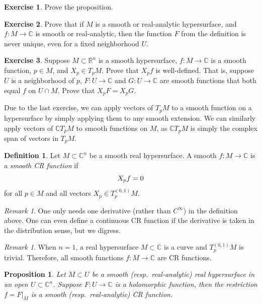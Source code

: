 \documentclass[12pt,openany]{book}
\newcommand{\avoidbreak}{\postdisplaypenalty=100}
\newcommand{\C}{{\mathbb{C}}}
\newcommand{\R}{{\mathbb{R}}}
\newcommand{\myindex}[1]{#1\index{#1}}
\theoremstyle{plain}
\newtheorem{prop}[thm]{Proposition}
\theoremstyle{remark}
\newtheorem{remark}[thm]{Remark}
\theoremstyle{definition}
\newtheorem{defn}[thm]{Definition}
\newenvironment{exbox}{%
    \def\FrameCommand{\vrule width 1pt \relax\hspace{10pt}}%
    \MakeFramed{\advance\hsize-\width\FrameRestore}%
}{%
    \endMakeFramed
}
\theoremstyle{exercise}
\newtheorem{exercise}{Exercise}[section]
\theoremstyle{example}
\begin{document}
\begin{exbox}
\begin{exercise}
Prove the proposition.
\end{exercise}

\begin{exercise}
Prove that if $M$ is a smooth or real-analytic
hypersurface, and $f \colon M \to \C$ is smooth or real-analytic, then the function $F$ from the definition is never unique,
even for a fixed neighborhood $U$.
\end{exercise}

\begin{exercise}
Suppose $M \subset \R^n$ is a smooth hypersurface, $f \colon M \to \C$
is a smooth function, $p \in M$, and $X_p \in T_p M$.  Prove that
$X_p f$ is well-defined.
That is, suppose
$U$ is a neighborhood of $p$,
$F \colon U \to \C$ and $G \colon U \to \C$
are smooth functions that both equal $f$ on $U \cap M$.
Prove that
$X_p F = X_p G$.
\end{exercise}
\end{exbox}

Due to the last exercise, we can apply vectors of $T_p M$ to
a smooth function on a hypersurface by simply applying
them to any smooth extension.  We can similarly apply vectors of
$\C T_p M$ to smooth functions on $M$, as
$\C T_p M$ is simply the complex span of vectors in $T_p M$.

\begin{defn}
Let $M \subset \C^n$ be a smooth real hypersurface.
A smooth $f \colon M \to \C$ is a
\emph{\myindex{smooth CR function}} if
\begin{equation*}
X_p f = 0
\avoidbreak
\end{equation*}
for all $p \in M$ and all vectors $X_p \in T^{(0,1)}_p M$.
\end{defn}

\begin{remark}
One only needs one derivative (rather than $C^\infty$) in the definition
above.
One can even
define a continuous CR function if the derivative is taken in the
distribution sense, but we digress.
\end{remark}

\begin{remark}
When $n=1$, a real hypersurface $M \subset \C$ is a curve and $T^{(0,1)}_p M$
is trivial.  Therefore, all smooth functions $f \colon M \to \C$ are CR functions.
\end{remark}

\begin{prop}
Let $M \subset U$ be a smooth (resp.\ real-analytic) real hypersurface in an
open $U
\subset \C^n$.  Suppose $F \colon U \to \C$ is a holomorphic function,
then the restriction $f = F|_M$ is a smooth (resp.\ real-analytic) CR function.
\end{prop}
\end{document}
